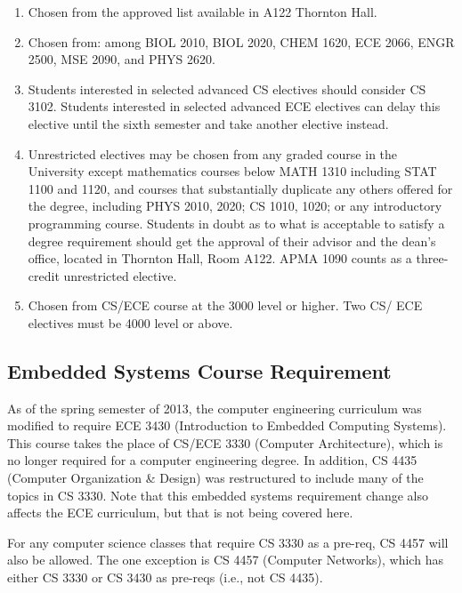 \documentclass[10pt,letter]{book}
\newenvironment{numlist}{
\begin{enumerate}
\setlength{\itemsep}{0pt}
\setlength{\parskip}{0pt}}
{\end{enumerate}}
\begin{document}
\begin{numlist}
\item Chosen from the approved list available in A122 Thornton Hall.
\item Chosen from: among BIOL 2010, BIOL 2020, CHEM 1620, ECE 2066, ENGR
  2500, MSE 2090, and PHYS 2620.
\item Students interested in selected advanced CS electives should
  consider CS 3102.  Students interested in selected advanced ECE
  electives can delay this elective until the sixth semester and take
  another elective instead.
\item Unrestricted electives may be chosen from any graded course in
  the University except mathematics courses below MATH 1310 including
  STAT 1100 and 1120, and courses that substantially duplicate any
  others offered for the degree, including PHYS 2010, 2020; CS 1010,
  1020; or any introductory programming course. Students in doubt as
  to what is acceptable to satisfy a degree requirement should get the
  approval of their advisor and the dean's office, located in Thornton
  Hall, Room A122. APMA 1090 counts as a three-credit unrestricted
  elective.
\item Chosen from CS/ECE course at the 3000 level or higher. Two
  CS/ ECE electives must be 4000 level or above.
\end{numlist}

\subsection{Embedded Systems Course Requirement}
\label{embedded}

As of the spring semester of 2013, the computer engineering curriculum
was modified to require ECE 3430 (Introduction to Embedded Computing
Systems).  This course takes the place of CS/ECE 3330 (Computer
Architecture), which is no longer required for a computer engineering
degree.  In addition, CS 4435 (Computer Organization \& Design) was
restructured to include many of the topics in CS 3330.  Note that this
embedded systems requirement change also affects the ECE curriculum,
but that is not being covered here.

For any computer science classes that require CS 3330 as a pre-req, CS
4457 will also be allowed.  The one exception is CS 4457 (Computer
Networks), which has either CS 3330 or CS 3430 as pre-reqs (i.e., not
CS 4435).
\end{document}
